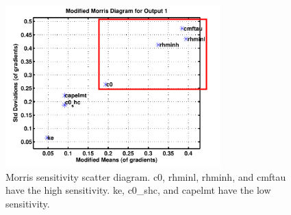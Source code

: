 \documentclass[gmd, manuscript]{copernicus}
\begin{document}







\clearpage


\begin{figure}[t]
\includegraphics[width=8.3cm]{Morris}
\caption{Morris sensitivity scatter diagram. c0, rhminl, rhminh, and cmftau have the high sensitivity. ke, c0\_shc, and capelmt have the low sensitivity.}
\end{figure}
\end{document}
